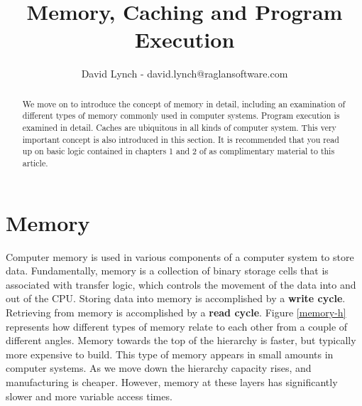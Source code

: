 \documentclass[10pt,a4paper]{article}
\title{Memory, Caching and Program Execution}
\author{David Lynch - david.lynch@raglansoftware.com }
\begin{document}
\maketitle
\begin{abstract}
We move on to introduce the concept of memory in detail, including an examination of different types of memory commonly used in computer systems. Program execution is examined in detail. Caches are ubiquitous in all kinds of computer system. This very important concept is also introduced in this section. It is recommended that you read up on basic logic contained in chapters 1 and 2 of \cite{LOGICDESIGN} as complimentary material to this article. 
\end{abstract}
\section{Memory}
Computer memory is used in various components of a computer system to store data. Fundamentally, memory is a collection of binary storage cells that is associated with transfer logic, which controls the movement of the data into and out of the CPU. Storing data into memory is accomplished by a {\bf write cycle}. Retrieving from memory is accomplished by a {\bf read cycle}. Figure \ref{memory-h} represents how different types of memory relate to each other from a couple of different angles. Memory towards the top of the hierarchy is faster, but typically more expensive to build. This type of memory appears in small amounts in computer systems. As we move down the hierarchy capacity rises, and manufacturing is cheaper. However, memory at these layers has significantly slower and more variable access times. 
\end{document}
